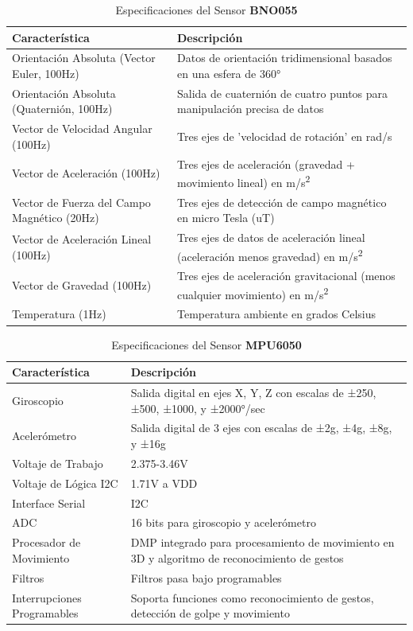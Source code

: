     \begin{table}[h]
\centering
\caption{Especificaciones del Sensor \textbf{BNO055}}
\label{tab:bno055_specs}
\begin{tabular}{|l|l|}
\hline
\textbf{Característica} & \textbf{Descripción} \\ \hline
Orientación Absoluta (Vector Euler, 100Hz) & Datos de orientación tridimensional basados en una esfera de 360° \\ \hline
Orientación Absoluta (Quaternión, 100Hz) & Salida de cuaternión de cuatro puntos para manipulación precisa de datos \\ \hline
Vector de Velocidad Angular (100Hz) & Tres ejes de 'velocidad de rotación' en rad/s \\ \hline
Vector de Aceleración (100Hz) & Tres ejes de aceleración (gravedad + movimiento lineal) en m/s\textsuperscript{2} \\ \hline
Vector de Fuerza del Campo Magnético (20Hz) & Tres ejes de detección de campo magnético en micro Tesla (uT) \\ \hline
Vector de Aceleración Lineal (100Hz) & Tres ejes de datos de aceleración lineal (aceleración menos gravedad) en m/s\textsuperscript{2} \\ \hline
Vector de Gravedad (100Hz) & Tres ejes de aceleración gravitacional (menos cualquier movimiento) en m/s\textsuperscript{2} \\ \hline
Temperatura (1Hz) & Temperatura ambiente en grados Celsius \\ \hline
\end{tabular}
\end{table}

\begin{table}[H]
\centering
\caption{Especificaciones del Sensor \textbf{MPU6050}}
\label{tab:mpu6050_specs}
\begin{tabular}{|l|l|}
\hline
\textbf{Característica} & \textbf{Descripción} \\ \hline
Giroscopio & Salida digital en ejes X, Y, Z con escalas de ±250, ±500, ±1000, y ±2000°/sec \\ \hline
Acelerómetro & Salida digital de 3 ejes con escalas de ±2g, ±4g, ±8g, y ±16g \\ \hline
Voltaje de Trabajo & 2.375-3.46V \\ \hline
Voltaje de Lógica I2C & 1.71V a VDD \\ \hline
Interface Serial & I2C \\ \hline
ADC & 16 bits para giroscopio y acelerómetro \\ \hline
Procesador de Movimiento & DMP integrado para procesamiento de movimiento en 3D y algoritmo de reconocimiento de gestos \\ \hline
Filtros & Filtros pasa bajo programables \\ \hline
Interrupciones Programables & Soporta funciones como reconocimiento de gestos, detección de golpe y movimiento \\ \hline
\end{tabular}
\end{table}
\\ \\

